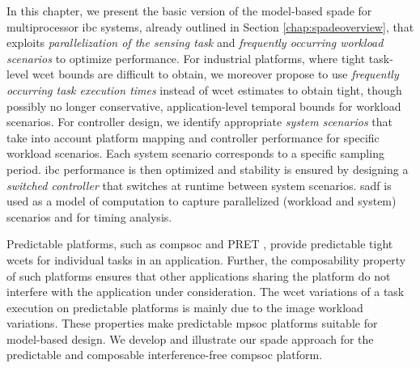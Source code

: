 \sloppypar
In this chapter, we present the basic version of the model-based \gls{spade} for multiprocessor \gls{ibc} systems, already outlined in Section \ref{chap:spadeoverview}, that exploits \emph{parallelization of the sensing task} and \emph{frequently occurring workload scenarios} to optimize performance. For industrial platforms, where tight task-level \gls{wcet} bounds are difficult to obtain, we moreover propose to use \emph{frequently occurring task execution times} instead of \gls{wcet} estimates to obtain tight, though possibly no longer conservative, application-level temporal bounds for workload scenarios. 
For controller design, we identify appropriate \emph{system scenarios} \cite{gheorghita2009system} that take into account platform mapping and controller performance for specific workload scenarios. Each system scenario corresponds to a specific sampling period. \gls{ibc} performance is then optimized and stability is ensured by designing a \emph{switched controller} that switches at runtime between system scenarios. \Gls{sadf} \cite{theelen2006scenario} is used as a model of computation to capture parallelized (workload and system) scenarios and for timing analysis.

\sloppypar 
Predictable platforms, such as \gls{compsoc} \cite{hansson2009compsoc} and PRET \cite{edwards2007case}, provide predictable tight \glspl{wcet} for individual tasks in an application. Further, the composability property of such platforms ensures that other applications sharing the platform do not interfere with the application under consideration. The \gls{wcet} variations of a task execution on predictable platforms is mainly due to the image workload variations. These properties make predictable \gls{mpsoc} platforms suitable for model-based design. We develop and illustrate our \gls{spade} approach for the predictable and composable interference-free \gls{compsoc} platform. 

